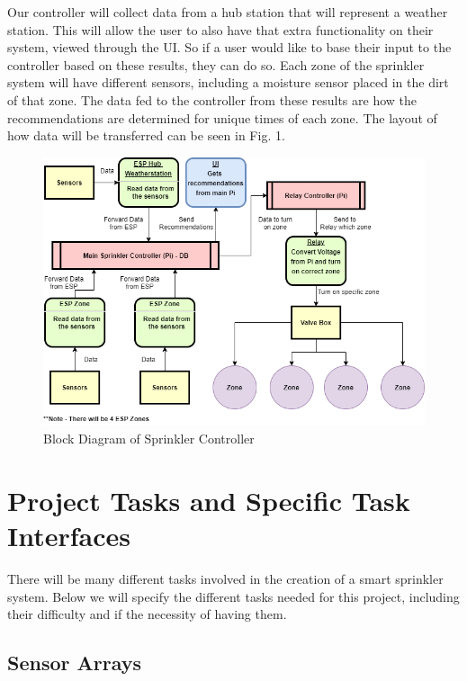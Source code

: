 \documentclass[letterpaper, 10 pt, conference]{ieeeconf}  %
\begin{document}
Our controller will collect data from a hub station that will represent a weather station. This will allow the user to also have that extra functionality on their system, viewed through the UI. So if a user would like to base their input to the controller based on these results, they can do so. Each zone of the sprinkler system will have different sensors, including a moisture sensor placed in the dirt of that zone. The data fed to the controller from these results are how the recommendations are determined for unique times of each zone. The layout of how data will be transferred can be seen in Fig. 1.

\begin{figure}
	\centering
	\begin{minipage}{1\textwidth}
		\centering
		\includegraphics[width=\textwidth]{Diagram.png}
		\caption{Block Diagram of Sprinkler Controller}
		\label{label1}
	\end{minipage}
\end{figure}


\section{Project Tasks and Specific Task Interfaces}
There will be many different tasks involved in the creation of a smart sprinkler system. Below we will specify the different tasks needed for this project, including their difficulty and if the necessity of having them.

\subsection{Sensor Arrays}
\end{document}
